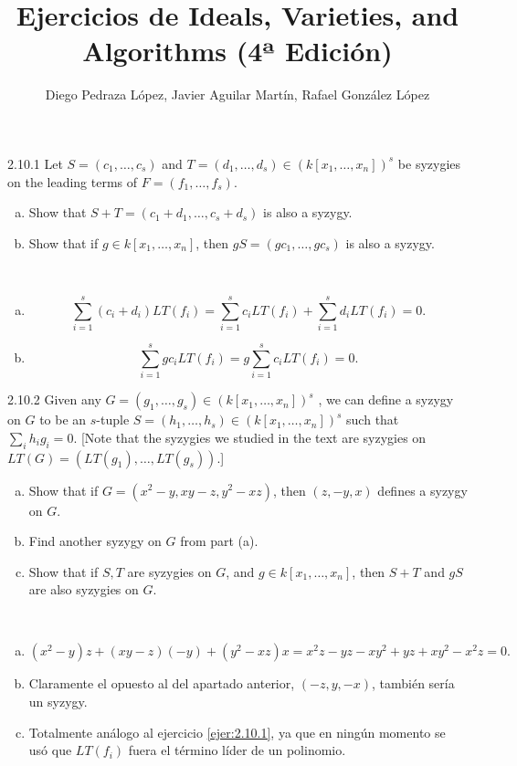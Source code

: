 \documentclass[twoside]{article}
\begin{document}
\title{Ejercicios de Ideals, Varieties, and Algorithms (4ª Edición)}
\author{Diego Pedraza López, Javier Aguilar Martín, Rafael González López}
\maketitle

\begin{ejercicio}{2.10.1}
Let $S = (c_1, \dots , c_s)$ and $T = (d_1, \dots , d_s) ∈ (k[x_1, \dots , x_n])^s$ be syzygies on the leading
terms of $F = (f_1, \dots , f_s)$.
\begin{enumerate}[a.]
\item Show that $S + T = (c_1 + d_1, \dots , c_s + d_s)$ is also a syzygy.
\item Show that if $g ∈ k[x_1,\dots , x_n]$, then $g  S = (gc_1, \dots , gc_s)$ is also a syzygy.
\end{enumerate}
\end{ejercicio}

\begin{solucion}\
\begin{enumerate}[a.]
\item 
\[
\sum_{i=1}^s(c_i+d_i)LT(f_i)=\sum_{i=1}^s c_iLT(f_i)+\sum_{i=1}^s d_iLT(f_i)=0.
\]
\item
\[
\sum_{i=1}^sgc_iLT(f_i)=g\sum_{i=1}^s c_iLT(f_i)=0.
\]
\end{enumerate}
\end{solucion}

\newpage

\begin{ejercicio}{2.10.2}
Given any $G = (g_1, \dots , g_s) ∈ (k[x_1, \dots , x_n])^s$ , we can define a syzygy on $G$ to be an $s$-tuple
$S = (h_1,\dots , h_s) ∈ (k[x_1, \dots , x_n])^s$ such that
$\sum_i h_ig_i = 0$. [Note that the syzygies
we studied in the text are syzygies on $LT(G) = (LT(g_1), \dots , LT(g_s))$.]
\begin{enumerate}[a.]
\item Show that if $G = (x^2 − y, xy − z, y^2 − xz)$, then $(z,−y, x)$ defines a syzygy on $G$.
\item Find another syzygy on $G$ from part (a).
\item Show that if $S, T$ are syzygies on $G$, and $g ∈ k[x_1,\dots , x_n]$, then $S+T$ and $gS$ are also
syzygies on $G$.

\end{enumerate}
\end{ejercicio}
\begin{solucion}\
\begin{enumerate}[a.]
\item 
\[
(x^2-y)z+(xy-z)(-y)+(y^2-xz)x=x^2z-yz-xy^2+yz+xy^2-x^2z=0.
\]
\item Claramente el opuesto al del apartado anterior, $(-z,y, -x)$, también sería un syzygy.
\item Totalmente análogo al ejercicio \ref{ejer:2.10.1}, ya que en ningún momento se usó que $LT(f_i)$ fuera el término líder de un polinomio.
\end{enumerate}
\end{solucion}
\newpage
\end{document}
